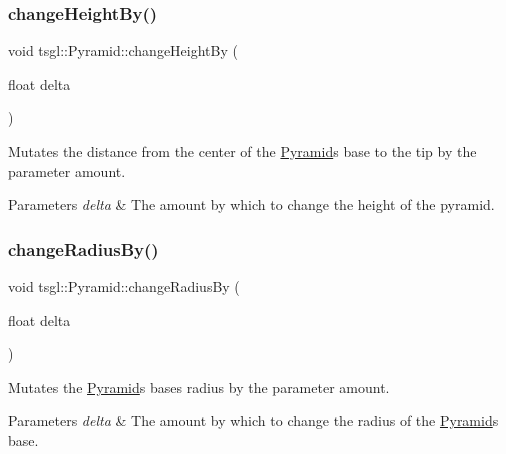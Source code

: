 \subsubsection{\texorpdfstring{change\+Height\+By()}{changeHeightBy()}}
{\footnotesize\ttfamily void tsgl\+::\+Pyramid\+::change\+Height\+By (\begin{DoxyParamCaption}\item[{float}]{delta }\end{DoxyParamCaption})\hspace{0.3cm}{\ttfamily [virtual]}}



Mutates the distance from the center of the \hyperlink{classtsgl_1_1_pyramid}{Pyramid}\textquotesingle{}s base to the tip by the parameter amount. 


\begin{DoxyParams}{Parameters}
{\em delta} & The amount by which to change the height of the pyramid. \\
\hline
\end{DoxyParams}
\mbox{\label{classtsgl_1_1_pyramid_a91f86ca2ac58df9ac8d2ad00781b8442}} 
\subsubsection{\texorpdfstring{change\+Radius\+By()}{changeRadiusBy()}}
{\footnotesize\ttfamily void tsgl\+::\+Pyramid\+::change\+Radius\+By (\begin{DoxyParamCaption}\item[{float}]{delta }\end{DoxyParamCaption})\hspace{0.3cm}{\ttfamily [virtual]}}



Mutates the \hyperlink{classtsgl_1_1_pyramid}{Pyramid}\textquotesingle{}s base\textquotesingle{}s radius by the parameter amount. 


\begin{DoxyParams}{Parameters}
{\em delta} & The amount by which to change the radius of the \hyperlink{classtsgl_1_1_pyramid}{Pyramid}\textquotesingle{}s base. \\
\hline
\end{DoxyParams}
\mbox{\label{classtsgl_1_1_pyramid_a9c93002e90ac1f3385c4d3154ca0321a}} 
